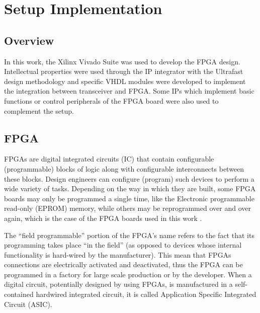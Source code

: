 \chapter{Setup Implementation}
\label{chap:implementation}

\section{Overview}


In this work, the Xilinx Vivado Suite was used to develop the FPGA design.
Intellectual properties were used through the IP integrator with the Ultrafast
design methodology \cite{xilinx:ultrafast} and specific VHDL modules were
developed to implement the integration between transceiver and FPGA. Some IPs
which implement basic functions or control peripherals of the FPGA board were
also used to complement the setup.

\section{FPGA}

FPGAs are digital integrated circuits (IC) that contain configurable
(programmable) blocks of logic along with configurable interconnects between
these blocks. Design engineers can configure (program) such devices to perform a
wide variety of tasks. Depending on the way in which they are built, some FPGA
boards may only be programmed a single time, like the Electronic programmable
read-only (EPROM) memory, while others may be reprogrammed over and over again,
which is the case of the FPGA boards used in this work \cite{max2004}.

The “field programmable” portion of the FPGA’s name refers to the fact that its
programming takes place “in the field” (as opposed to devices whose internal
functionality is hard-wired by the manufacturer). This mean that FPGAs
connections are electrically activated and deactivated, thus the FPGA can be
programmed in a factory for large scale production or by the developer. When a
digital circuit, potentially designed by using FPGAs, is manufactured in a
self-contained hardwired integrated circuit, it is called Application Specific
Integrated Circuit (ASIC).


